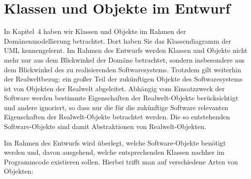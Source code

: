 \cleardoublepage
\chapter{Klassen und Objekte im Entwurf}
\label{sec:Kap-8}

In Kapitel~4 haben wir Klassen und Objekte im Rahmen der Domänenmodellierung betrachtet. Dort haben Sie das Klassendiagramm der UML kennengelernt. Im Rahmen des Entwurfs werden Klassen und Objekte nicht mehr nur aus dem Blickwinkel der Domäne betrachtet, sondern insbesondere aus dem Blickwinkel des zu realisierenden Softwaresystems. Trotzdem gilt weiterhin der Realweltbezug: ein großer Teil der zukünftigen Objekte des Softwaresystems ist von Objekten der Realwelt abgeleitet. Abhängig vom Einsatzzweck der Software werden bestimmte Eigenschaften der Realwelt-Objekte berücksichtigt und andere ignoriert, so dass nur die für die zukünftige Software relevanten Eigenschaften der Realwelt-Objekte betrachtet werden. Die so entstehenden Software-Objekte sind damit Abstraktionen von Realwelt-Objekten. 

Im Rahmen des Entwurfs wird überlegt, welche Software-Objekte benötigt werden und, davon ausgehend, welche entsprechenden Klassen nachher im Programmcode existieren sollen. Hierbei trifft man auf verschiedene Arten von Objekten:

